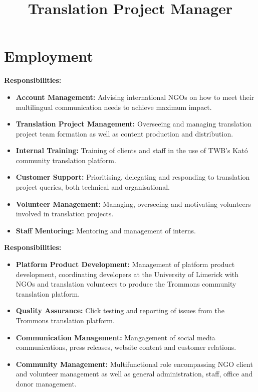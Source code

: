 \documentclass[a4paper,11pt]{moderncv}
\title{Translation Project Manager}
\begin{document}
\maketitle

\section{Employment}

{
  \textbf{Responsibilities:}
  \begin{itemize}
  \item \textbf{Account Management:} Advising international NGOs on how to meet their multilingual communication needs to achieve maximum impact.
  \item \textbf{Translation Project Management:} Overseeing and managing translation project team formation as well as content production and distribution.
  \item \textbf{Internal Training:} Training of clients and staff in the use of TWB's Kató community translation platform.
  \item \textbf{Customer Support:} Prioritising, delegating and responding to translation project queries, both technical and organisational.
  \item \textbf{Volunteer Management:} Managing, overseeing and motivating volunteers involved in translation projects.
  \item \textbf{Staff Mentoring:} Mentoring and management of interns.
  \end{itemize}
}

{
  \textbf{Responsibilities:}
  \begin{itemize}
  \item \textbf{Platform Product Development:} Management of platform product development, coordinating developers at the University of Limerick with NGOs and translation volunteers to produce the Trommons community translation platform.
  \item \textbf{Quality Assurance:} Click testing and reporting of issues from the Trommons translation platform.
  \item \textbf{Communication Management:} Mangagement of social media communications, press releases, website content and customer relations.
  \item \textbf{Community Management:} Multifunctional role encompassing NGO client and volunteer management as well as general administration, staff, office and donor management.
  \end{itemize}
}
\end{document}
